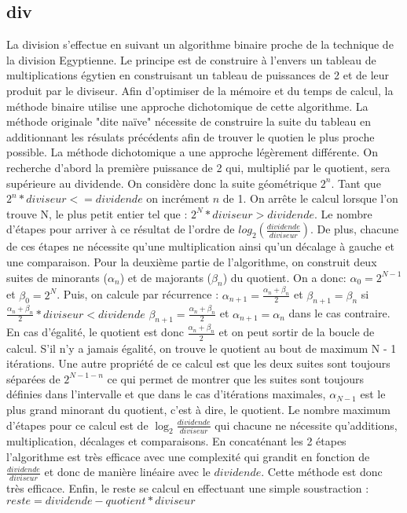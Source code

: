 \documentclass{article}
\begin{document}
\subsection{div}
La division s'effectue en suivant un algorithme binaire proche de la technique de la division Egyptienne. Le principe est de construire à l'envers un tableau de multiplications
égytien en construisant un tableau de puissances de 2 et de leur produit par le diviseur. Afin d'optimiser de la mémoire et du temps de calcul, la méthode binaire utilise une approche
dichotomique de cette algorithme. La méthode originale "dite naïve" nécessite de construire la suite du tableau en additionnant les résulats précédents afin de trouver le quotien le plus
proche possible. La méthode dichotomique a une approche légèrement différente. On recherche d'abord la première puissance de 2 qui, multiplié par le quotient, sera supérieure au dividende.
On considère donc la suite géométrique $2^{n}$. Tant que $2^{n} * diviseur <= dividende$ on incrément $n$ de 1. On arrête le calcul lorsque l'on trouve N, le plus petit entier tel que :
$2^{N} * diviseur > dividende$. Le nombre d'étapes pour arriver à ce résultat de l'ordre de $log_{2}(\frac{dividende}{diviseur})$. De plus, chacune de ces étapes ne nécessite qu'une multiplication
ainsi qu'un décalage à gauche et une comparaison.
Pour la deuxième partie de l'algorithme, on construit deux suites de minorants ($\alpha_{n}$) et de majorants ($\beta_{n}$) du quotient.
On a donc: $\alpha_{0} = 2^{N-1}$ et $\beta_{0} = 2^{N}$.
Puis, on calcule par récurrence :
$\alpha_{n+1} = \frac{\alpha_{n} + \beta_{n}}{2}$ et $\beta_{n+1} = \beta_{n}$ si $\frac{\alpha_{n} + \beta_{n}}{2} * diviseur < dividende$
$\beta_{n+1} = \frac{\alpha_{n} + \beta_{n}}{2}$ et $\alpha_{n+1} = \alpha_{n}$ dans le cas contraire.
En cas d'égalité, le quotient est donc $\frac{\alpha_{n} + \beta_{n}}{2}$ et on peut sortir de la boucle de calcul. S'il n'y a jamais égalité, on trouve le quotient au bout de maximum N - 1 itérations.
Une autre propriété de ce calcul est que les deux suites sont toujours séparées de $2^{N - 1 - n}$ ce qui permet de montrer que les suites sont toujours définies dans l'intervalle et que dans le cas
d'itérations maximales, $\alpha_{N - 1}$ est le plus grand minorant du quotient, c'est à dire, le quotient.
Le nombre maximum d'étapes pour ce calcul est de $\log_2{\frac{dividende}{diviseur}}$ qui chacune ne nécessite qu'additions, multiplication, décalages et comparaisons.
En concaténant les 2 étapes l'algorithme est très efficace avec une complexité qui grandit en fonction de $\frac{dividende}{diviseur}$ et donc de manière linéaire avec le $dividende$. Cette méthode est donc très efficace.
Enfin, le reste se calcul en effectuant une simple soustraction : $reste = dividende - quotient * diviseur$
\end{document}
